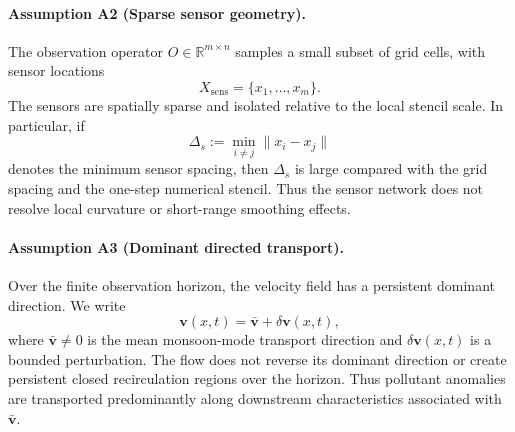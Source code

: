 


\paragraph{Assumption A2 (Sparse sensor geometry).}
The observation operator \(O\in\mathbb{R}^{m\times n}\) samples a
small subset of grid cells, with sensor locations
\[
X_{\mathrm{sens}}=\{x_1,\ldots,x_m\}.
\]
The sensors are spatially sparse and isolated relative to the local
stencil scale. In particular, if
\[
\Delta_s := \min_{i\neq j}\|x_i-x_j\|
\]
denotes the minimum sensor spacing, then \(\Delta_s\) is large compared
with the grid spacing and the one-step numerical stencil. Thus the
sensor network does not resolve local curvature or short-range
smoothing effects.

\paragraph{Assumption A3 (Dominant directed transport).}
Over the finite observation horizon, the velocity field has a persistent
dominant direction. We write
\[
\mathbf v(x,t)=\bar{\mathbf v}+\delta \mathbf v(x,t),
\]
where \(\bar{\mathbf v}\neq 0\) is the mean monsoon-mode transport
direction and \(\delta \mathbf v(x,t)\) is a bounded perturbation. The
flow does not reverse its dominant direction or create persistent closed
recirculation regions over the horizon. Thus pollutant anomalies are
transported predominantly along downstream characteristics associated
with \(\bar{\mathbf v}\).

